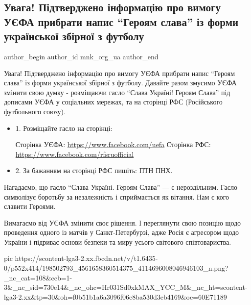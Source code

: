  
 
 
 
 
 
\subsection{Увага! Підтверджено інформацію про вимогу УЄФА прибрати напис \enquote{Героям слава} із форми української збірної з футболу}
\label{sec:10_06_2021.fb.mnk_org_ua.1.uefa_skandal}
\ifcmt
 author_begin
   author_id mnk_org_ua
 author_end
\fi

Увага! Підтверджено інформацію про вимогу УЄФА прибрати напис \enquote{Героям слава} із
форми української збірної з футболу. Давайте разом змусимо УЄФА змінити свою
думку - розміщаючи гасло \enquote{Слава Україні! Героям Слава} під дописами УЄФА у
соціальних мережах, та на сторінці РФС (Російського футбольного союзу).

\begin{itemize}
\item 1. Розміщайте гасло на сторінці:

Сторінка УЄФА: \url{https://www.facebook.com/uefa} 
Сторінка РФС: \url{https://www.facebook.com/rfsruofficial} 

\item 2. За бажанням на сторінці РФС пишіть: ПТН ПНХ.
\end{itemize}

Нагадаємо, що гасло \enquote{Слава Україні. Героям Слава} — є нероздільним. Гасло
символізує боротьбу за незалежність і сприймається як вітання. Нам є кого
славити Героями.

Вимагаємо від УЄФА змінити своє рішення. І переглянути свою позицію щодо
проведення одного із матчів у Санкт-Петербурзі, адже Росія є агресором щодо
України і підриває основи безпеки та миру усього світового співтовариства.

\ifcmt
  pic https://scontent-lga3-2.xx.fbcdn.net/v/t1.6435-0/p552x414/198502793_4561658360514375_4114696008046946103_n.png?_nc_cat=108&ccb=1-3&_nc_sid=730e14&_nc_ohc=Hr031Sd0xkMAX_YCC_M&_nc_ht=scontent-lga3-2.xx&tp=30&oh=f0b51b1a6a3096f06e8ba530d3eb4169&oe=60E71189
\fi
